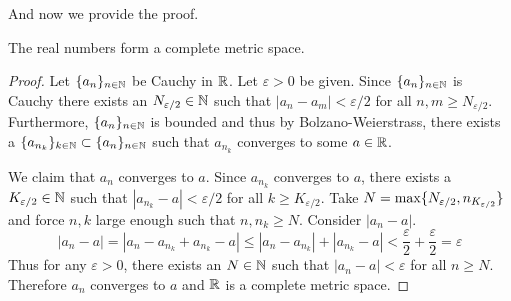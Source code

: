 \documentclass[notitlepage]{simple}
\begin{document}
And now we provide the proof.

\begin{thm}
	The real numbers form a complete metric space.
\end{thm}
\begin{proof}
	Let $\lbrace a_n \rbrace_{n\in\mathbb{N}}$ be Cauchy in $\mathbb{R}$.
	Let $\varepsilon > 0$ be given.
	Since $\lbrace a_n \rbrace_{n\in\mathbb{N}}$ is Cauchy there exists an $N_{\varepsilon/2}\in\mathbb{N}$ such that $|a_n-a_m|<\varepsilon/2$ for all $n,m\geq N_{\varepsilon/2}$.
	Furthermore, $\lbrace a_n \rbrace_{n\in\mathbb{N}}$ is bounded and thus by Bolzano-Weierstrass, there exists a $\lbrace a_{n_k} \rbrace_{k\in\mathbb{N}}\subset\lbrace a_n \rbrace_{n\in\mathbb{N}}$ such that $a_{n_k}$ converges to some $a\in\mathbb{R}$.

	We claim that $a_n$ converges to $a$.
	Since $a_{n_k}$ converges to $a$, there exists a $K_{\varepsilon/2}\in\mathbb{N}$ such that $|a_{n_k}-a|<\varepsilon/2$ for all $k\geq K_{\varepsilon/2}$.
	Take $N=\max\lbrace N_{\varepsilon/2},n_{K_{\varepsilon/2}} \rbrace$ and force $n,k$ large enough such that $n,n_k\geq N$.
	Consider $|a_n-a|$.
	\[
		|a_n-a|=|a_n-a_{n_k}+a_{n_k}-a|\leq |a_n-a_{n_k}|+|a_{n_k}-a|<\frac{\varepsilon}{2}+\frac{\varepsilon}{2}=\varepsilon
	\]
	Thus for any $\varepsilon >0$, there exists an $N\in\mathbb{N}$ such that $|a_n-a|<\varepsilon$ for all $n\geq N$.
	Therefore $a_n$ converges to $a$ and $\mathbb{R}$ is a complete metric space.
\end{proof}
\end{document}
